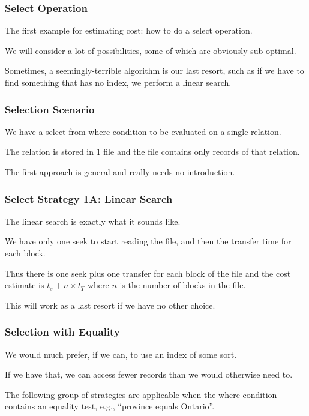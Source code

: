 \begin{frame}
\frametitle{Select Operation}

The first example for estimating cost: how to do a select operation. 

We will consider a lot of possibilities, some of which are obviously sub-optimal. 


Sometimes, a seemingly-terrible algorithm is our last resort, such as if we have to find something that has no index, we perform a linear search.


\end{frame}


\begin{frame}
\frametitle{Selection Scenario}

We have a select-from-where condition to be evaluated on a single relation.  

The relation is stored in 1 file and the file contains only records of that relation. 

The first approach is general and really needs no introduction.

\end{frame}



\begin{frame}
\frametitle{Select Strategy 1A: Linear Search}

The linear search is exactly what it sounds like.

We have only one seek to start reading the file, and then the transfer time for each block. 

Thus there is one seek plus one transfer for each block of the file and the cost estimate is $t_{s} + n \times t_{T}$ where $n$ is the number of blocks in the file.

This will work as a last resort if we have no other choice.

\end{frame}


\begin{frame}
\frametitle{Selection with Equality}

We would much prefer, if we can, to use an index of some sort.

If we have that, we can access fewer records than we would otherwise need to. 

The following group of strategies are applicable when the where condition contains an equality test, e.g., ``province equals Ontario''.

\end{frame}



